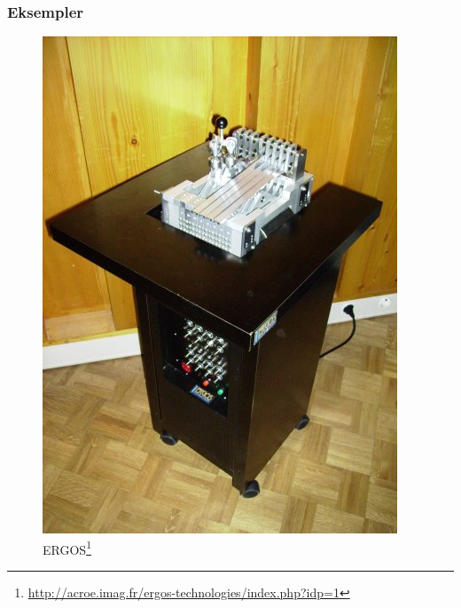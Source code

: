\documentclass{beamer}
\begin{document}
\begin{frame}[allowframebreaks]
	\frametitle{Eksempler}
	\begin{figure}
		\includegraphics[scale=.31]{figs/ERGOS_Photo02.jpg}
		\caption{ERGOS\footnote{\url{http://acroe.imag.fr/ergos-technologies/index.php?idp=1}}}
	\end{figure}
	

\end{frame}
\end{document}
